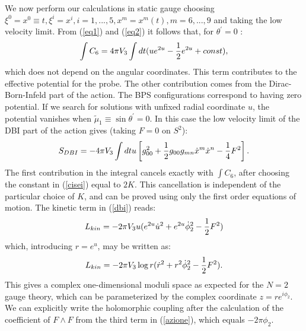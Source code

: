 \documentclass[a4paper,12pt]{article}
\begin{document}
We  now perform our calculations in static gauge choosing
$\xi^{0}=x^{0}\equiv t, \xi^{i}=x^{i}, i=1,...,5 , x^{m}=x^{m}(t), m=6,...,9$ and taking the low velocity limit. From (\ref{eq1}) and (\ref{eq2}) it follows that, for $\theta^\prime=0$ :
\begin{equation}
\int C_{6}=4\pi V_{3}\int dt (ue^{2u}-{1\over2}e^{2u}+const),
\label{cisei}
\end{equation}
which does not depend on the angular coordinates. This term contributes to the effective potential for the probe. The other contribution comes 
from the Dirac-Born-Infeld part of the action. 
The BPS 
configurations correspond to having zero potential. If we search for solutions with unfixed radial coordinate $u$, the potential vanishes when $\tilde{\mu}_{1}\equiv\sin\theta^\prime=0$. In this case the low velocity limit of the DBI part of the action gives (taking $F=0$ on $S^{2}$):
\begin{equation}
S_{DBI}= -4\pi V_{3}\int dt u\left[g^{2}_{00}+{1\over2}g_{00}g_{mn}\dot{x}^{m}\dot{x}^{n}-{1\over4}F^{2}\right].
\label{dbi}
\end{equation}
The first contribution in the integral cancels exactly with $\int C_{6}$, after choosing the constant in (\ref{cisei}) equal to $2K$. This cancellation is independent of the particular
 choice of $K$, and can be proved using only the first order equations of
motion. The kinetic term in (\ref{dbi}) reads:
\begin{equation}
L_{kin}= -2\pi V_{3}u(e^{2u}{\dot{u}}^{2}+e^{2u}\dot{\phi}_{2}^{2}- {1\over2}F^2)
\end{equation}
which, introducing $r=e^{u}$, may be written as:
\begin{equation}
L_{kin}= -2\pi V_{3}\log r({\dot{r}}^{2}+ r^{2}\dot{\phi}_{2}^{2}- {1\over2}F^2).
\end{equation}
This gives a complex one-dimensional moduli space as expected for the $N=2$ gauge theory, which can be parameterized by the complex coordinate $z=re^{i\phi_{2}}$. We can explicitly write the holomorphic coupling after the calculation of the coefficient of $F\wedge F$ from the third term in (\ref{azione}), which equals $-2\pi\phi_{2}$.
\end{document}
